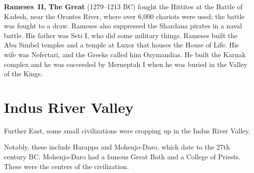 \textbf{Rameses~II, The Great} (1279--1213 BC) fought the Hittites at the Battle of Kadesh,
near the Orontes River, where over 6,000 chariots were used;
the battle was fought to a draw.
Rameses also suppressed the Shardana pirates in a naval battle.
His father was Seti I, who did some military things.
Rameses built the Abu Simbel temples and a temple at Luxor that houses the House of Life.
His wife was Nefertari, and the Greeks called him Ozymandias.
He built the Karnak complex and he was succeeded by Merneptah I when he was buried in the Valley of the Kings.

\section{Indus River Valley}

Further East, some small civilizations were cropping up in the Indus River Valley.

Notably, these include Harappa and Mohenjo-Daro, which date to the 27th century BC\@.
Mohenjo-Daro had a famous Great Bath and a College of Priests.
These were the centers of the civilization.
